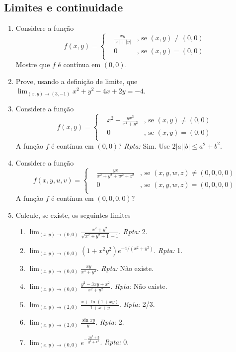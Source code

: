 \documentclass[11pt]{article}
\begin{document}
    \subsection{Limites e continuidade}
     \begin{enumerate}
    \item Considere a função 
     $$
    f(x,y)= \left\{  
            \begin{array}{lll}
    &\frac{xy}{|x|+|y|} &\text{, se } (x,y)\neq (0,0) \\
    & 0 &\text{, se } (x,y)=(0,0)  \\
            \end{array}
            \right. 
    $$      
    Mostre que $f$ é contínua em $(0,0)$.
    \item Prove, usando a definição de limite, que 
    $\lim_{(x,y)\rightarrow (3,-1)} x^{2}+y^{2}-4x+2y=-4$.
  
    \item Considere a função 
     $$
    f(x,y)= \left\{  
            \begin{array}{lll}
    &x^{2}+\frac{yx^{3}}{x^{4}+y^2} &\text{, se } (x,y)\neq (0,0) \\
    & 0 &\text{, se } (x,y)=(0,0)  \\
            \end{array}
            \right. 
    $$      
    A função $f$ é contínua em $(0,0)$? {\it Rpta: } Sim.
    Use $2|a||b|\leq a^{2}+b^{2}$.
    \item Considere a função 
     $$
    f(x,y,u,v)= \left\{  
            \begin{array}{lll}
    &\frac{yx}{x^{2}+y^2+w^{2}+z^2} &\text{, se } (x,y,w,z)\neq (0,0,0,0) \\
    & 0 &\text{, se } (x,y,w,z)=(0,0,0,0)  \\
            \end{array}
            \right. 
    $$      
    A função $f$ é contínua em $(0,0,0,0)$?

     \item Calcule, se existe, os seguintes limites 
       \begin{enumerate}
       \item $\lim_{(x,y)\rightarrow (0,0)} \frac{x^{2}+y^{2}}{\sqrt{x^{2}+y^{2}+1}-1}$.  {\it Rpta:} 2.
        \item $\lim_{(x,y)\rightarrow (0,0)} (1+x^{2}y^{2})
        e^{-1/(x^{2}+y^{2})}$.  {\it Rpta:} 1.
       \item  $\lim_{(x,y)\rightarrow (0,0)} \frac{xy}{x^{3}+y^{3}}$.  
       {\it Rpta:} Não existe.
        \item  $\lim_{(x,y)\rightarrow (0,0)} 
        \frac{y^{2}-3xy+x^{2}}{x^{2}+y^{2}}$.  {\it Rpta:} Não existe.
        \item  $\lim_{(x,y)\rightarrow (2,0)} 
        \frac{x+\ln(1+xy)}{1+x+y}$.  {\it Rpta:} 2/3.
      \item  $\lim_{(x,y)\rightarrow (2,0)} \frac{\sin xy}{y}$.  
      {\it Rpta:} 2.
      \item  $\lim_{(x,y)\rightarrow (0,0)} 
      e^{-\frac{xy^2+3}{y^2+x^2}}$.  
      {\it Rpta:} 0.
       \end{enumerate}
       

\end{enumerate}
\end{document}
